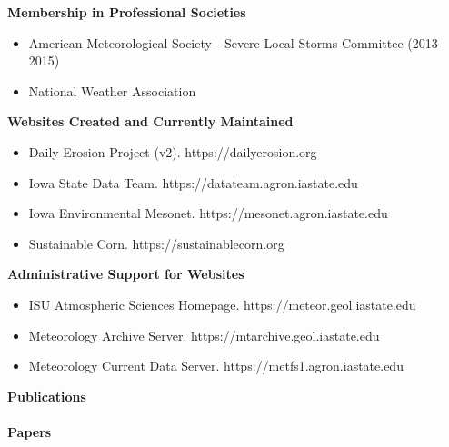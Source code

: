 %
\Large \bf Membership in Professional Societies
\normalsize \sf	
\begin{itemize}
\item American Meteorological Society - Severe Local Storms Committee (2013-2015)
\item National Weather Association
\end{itemize}
%
\Large \bf Websites Created and Currently Maintained
\normalsize \sf
\begin{itemize}
\item Daily Erosion Project (v2). https://dailyerosion.org
\item Iowa State Data Team. https://datateam.agron.iastate.edu
\item Iowa Environmental Mesonet. https://mesonet.agron.iastate.edu
\item Sustainable Corn. https://sustainablecorn.org
\end{itemize}
\Large \bf Administrative Support for Websites
\normalsize \sf
\begin{itemize}
\item ISU Atmospheric Sciences Homepage. https://meteor.geol.iastate.edu
\item Meteorology Archive Server. https://mtarchive.geol.iastate.edu
\item Meteorology Current Data Server. https://metfs1.agron.iastate.edu
\end{itemize}
%
\Large \bf Publications\\ \\
\normalsize \bf Papers
\normalsize \sf
